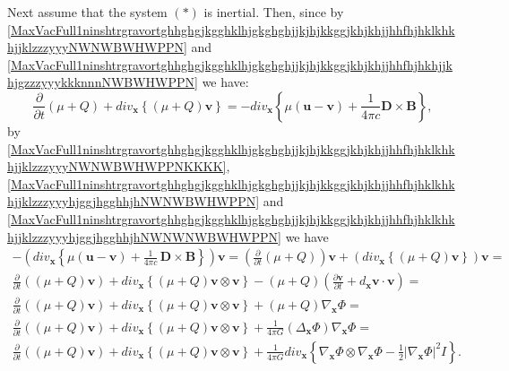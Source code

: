 \documentclass{article}
\theoremstyle{definition}
\theoremstyle{remark}
\renewcommand{\vec}[1]{\mathbf{#1}}
\newcommand{\er}{\eqref}
\newcommand{\er}{\eqref}
\begin{document}
 Next assume that the system $(*)$ is inertial. Then, since by \er{MaxVacFull1ninshtrgravortghhghgjkgghklhjgkghghjjkjhjkkggjkhjkhjjhhfhjhklkhkhjjklzzzyyyNWNWBWHWPPN}
and
\er{MaxVacFull1ninshtrgravortghhghgjkgghklhjgkghghjjkjhjkkggjkhjkhjjhhfhjhkhjjkhjgzzzyyykkknnnNWBWHWPPN}
we have:
\begin{equation}
\label{MaxVacFull1ninshtrgravortghhghgjkgghklhjgkghghjjkjhjkkggjkhjkhjjhhfhjhklkhkhjjklzzzyyyNWNWBWHWPPNKKKK}
\frac{\partial}{\partial t}\left(\mu+Q\right)+div_{\vec
x}\left\{\left(\mu+Q\right)\vec v\right\}=- div_\vec
x\left\{\mu(\vec u-\vec v)+\frac{1}{4\pi c}\vec D\times \vec
B\right\},
\end{equation}
by
\er{MaxVacFull1ninshtrgravortghhghgjkgghklhjgkghghjjkjhjkkggjkhjkhjjhhfhjhklkhkhjjklzzzyyyNWNWBWHWPPNKKKK},
\er{MaxVacFull1ninshtrgravortghhghgjkgghklhjgkghghjjkjhjkkggjkhjkhjjhhfhjhklkhkhjjklzzzyyyhjggjhgghhjhNWNWBWHWPPN}
and
\er{MaxVacFull1ninshtrgravortghhghgjkgghklhjgkghghjjkjhjkkggjkhjkhjjhhfhjhklkhkhjjklzzzyyyhjggjhgghhjhNWNWNWBWHWPPN}
we have
\begin{multline}\label{vhfffngghkjgghggtghjgfhjoyuiyuyhiyyukukyihyuSYSPNNWhgjgghyuyy8yuyughghhghghhjjhhjhjkhjCCmmGGKKJJKKjkhjh}
-\left(div_{\vec x}\left\{\mu \left(\vec u-\vec v\right)
+\frac{1}{4\pi c}\,\vec D\times \vec B\right\}\right)\vec
v=\left(\frac{\partial}{\partial t}\left(\mu+Q\right)\right)\vec
v+\left(div_{\vec x}\left\{\left(\mu+Q\right)\vec
v\right\}\right)\vec v=\\
\frac{\partial}{\partial t}\left(\left(\mu+Q\right)\vec
v\right)+div_{\vec x}\left\{\left(\mu+Q\right)\vec v\otimes\vec
v\right\}-\left(\mu+Q\right)\left(\frac{\partial\vec v}{\partial
t}+d_{\vec x}\vec v\cdot\vec v\right)=\\ \frac{\partial}{\partial
t}\left(\left(\mu+Q\right)\vec v\right)+div_{\vec
x}\left\{\left(\mu+Q\right)\vec v\otimes\vec
v\right\}+\left(\mu+Q\right)\nabla_{\vec x}\Phi=\\
\frac{\partial}{\partial t}\left(\left(\mu+Q\right)\vec
v\right)+div_{\vec x}\left\{\left(\mu+Q\right)\vec v\otimes\vec
v\right\}+\frac{1}{4\pi G}\left(\Delta_{\vec
x}\Phi\right)\nabla_{\vec x}\Phi=\\
\frac{\partial}{\partial t}\left(\left(\mu+Q\right)\vec
v\right)+div_{\vec x}\left\{\left(\mu+Q\right)\vec v\otimes\vec
v\right\}+\frac{1}{4\pi G}div_{\vec x}\left\{\nabla_{\vec
x}\Phi\otimes \nabla_{\vec x}\Phi-\frac{1}{2}\left|\nabla_{\vec
x}\Phi\right|^2I\right\}.
\end{multline}
\end{document}
